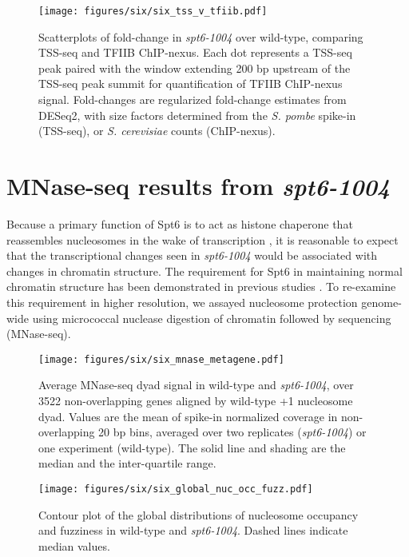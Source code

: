 \begin{figure}[h]
\centering
\texttt{[image: figures/six/six\_tss\_v\_tfiib.pdf]}
\caption[Scatterplots of fold-change in \textit{spt6-1004} over wild-type, comparing TSS-seq and TFIIB ChIP-nexus.]{Scatterplots of fold-change in \textit{spt6-1004} over wild-type, comparing TSS-seq and TFIIB ChIP-nexus. Each dot represents a TSS-seq peak paired with the window extending 200 bp upstream of the TSS-seq peak summit for quantification of TFIIB ChIP-nexus signal. Fold-changes are regularized fold-change estimates from DESeq2, with size factors determined from the \textit{S. pombe} spike-in (TSS-seq), or \textit{S. cerevisiae} counts (ChIP-nexus).}
\end{figure}

\section{MNase-seq results from \textit{spt6-1004}}

Because a primary function of Spt6 is to act as histone chaperone that reassembles nucleosomes in the wake of transcription \citep{duina2011}, it is reasonable to expect that the transcriptional changes seen in \textit{spt6-1004} would be associated with changes in chromatin structure.
The requirement for Spt6 in maintaining normal chromatin structure has been demonstrated in previous studies \citep{bortvin1996, ivanovska2011, jeronimo2015, kaplan2003, perales2013, vanbakel2013}.
To re-examine this requirement in higher resolution, we assayed nucleosome protection genome-wide using micrococcal nuclease digestion of chromatin followed by sequencing (MNase-seq).

\begin{figure}[H]
    \centering
    \begin{minipage}[t]{2.875in}
        \centering
        \texttt{[image: figures/six/six\_mnase\_metagene.pdf]}
        \caption[Average MNase-seq dyad signal in wild-type and \textit{spt6-1004}, over non-overlapping genes aligned by wild-type +1 nucleosome dyad.]{Average MNase-seq dyad signal in wild-type and \textit{spt6-1004}, over 3522 non-overlapping genes aligned by wild-type +1 nucleosome dyad. Values are the mean of spike-in normalized coverage in non-overlapping 20 bp bins, averaged over two replicates (\textit{spt6-1004}) or one experiment (wild-type). The solid line and shading are the median and the inter-quartile range.}
        \label{fig:six_mnase_metagene}
    \end{minipage}\hfill
    \begin{minipage}[t]{2.875in}
        \centering
        \texttt{[image: figures/six/six\_global\_nuc\_occ\_fuzz.pdf]}
        \caption[Contour plot of nucleosome occupancy and fuzziness in wild-type and \textit{spt6-1004}.]{Contour plot of the global distributions of nucleosome occupancy and fuzziness in wild-type and \textit{spt6-1004}. Dashed lines indicate median values.}
        \label{fig:six_global_nuc_occ_fuzz}
    \end{minipage}
\end{figure}

